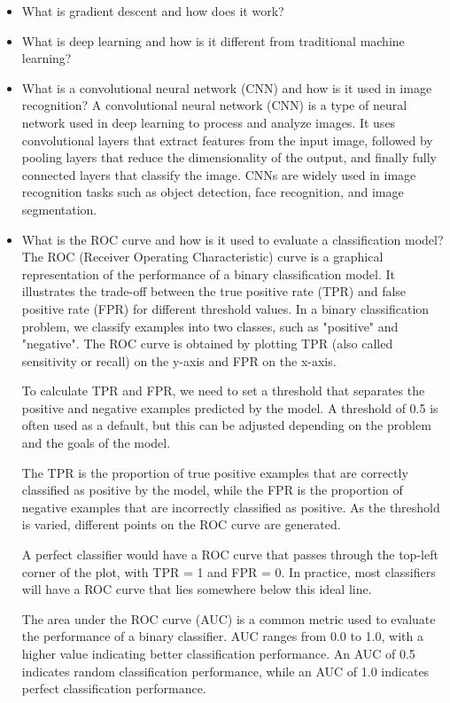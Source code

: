\documentclass[11pt]{article}
\begin{document}
\begin{enumerate}
\begin{itemize}
\item What is gradient descent and how does it work?
\item What is deep learning and how is it different from traditional machine learning?
\item What is a convolutional neural network (CNN) and how is it used in image recognition? A convolutional neural network (CNN) is a type of neural network used in deep learning to process and analyze images. It uses convolutional layers that extract features from the input image, followed by pooling layers that reduce the dimensionality of the output, and finally fully connected layers that classify the image. CNNs are widely used in image recognition tasks such as object detection, face recognition, and image segmentation.
\item What is the ROC curve and how is it used to evaluate a classification model? The ROC (Receiver Operating Characteristic) curve is a graphical representation of the performance of a binary classification model. It illustrates the trade-off between the true positive rate (TPR) and false positive rate (FPR) for different threshold values.
In a binary classification problem, we classify examples into two classes, such as "positive" and "negative". The ROC curve is obtained by plotting TPR (also called sensitivity or recall) on the y-axis and FPR on the x-axis.

To calculate TPR and FPR, we need to set a threshold that separates the positive and negative examples predicted by the model. A threshold of 0.5 is often used as a default, but this can be adjusted depending on the problem and the goals of the model.

The TPR is the proportion of true positive examples that are correctly classified as positive by the model, while the FPR is the proportion of negative examples that are incorrectly classified as positive. As the threshold is varied, different points on the ROC curve are generated.

A perfect classifier would have a ROC curve that passes through the top-left corner of the plot, with TPR = 1 and FPR = 0. In practice, most classifiers will have a ROC curve that lies somewhere below this ideal line.

The area under the ROC curve (AUC) is a common metric used to evaluate the performance of a binary classifier. AUC ranges from 0.0 to 1.0, with a higher value indicating better classification performance. An AUC of 0.5 indicates random classification performance, while an AUC of 1.0 indicates perfect classification performance.


\end{itemize}
\end{enumerate}
\end{document}
